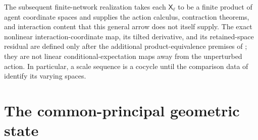 The subsequent finite-network realization takes each
\(\mathsf X_\ell\) to be a finite product of agent coordinate spaces and
supplies the action calculus, contraction theorems, and interaction content
that this general arrow does not itself supply.  The exact nonlinear
interaction-coordinate map, its tilted derivative, and its retained-space
residual are defined only after the additional product-equivalence premises
of ; they are not linear
conditional-expectation maps away from the unperturbed action.  In particular,
a scale sequence is a cocycle until the comparison data of
 identify its varying spaces. 

\section{The common-principal geometric state}
\label{sec:rg-common-principal-state}


